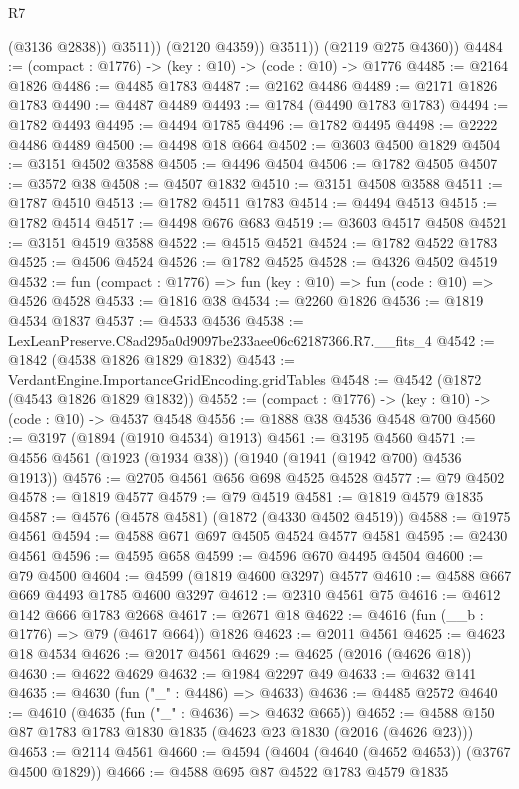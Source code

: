\begin{lexlean}{R7}
\begin{coremodule}
                  (@3136 @2838))
                @3511))
            (@2120 @4359))
          @3511))
      (@2119 @275 @4360))
@4484 := (compact : @1776) -> (key : @10) -> (code : @10) -> @1776
@4485 := @2164 @1826
@4486 := @4485 @1783
@4487 := @2162 @4486
@4489 := @2171 @1826 @1783
@4490 := @4487 @4489
@4493 := @1784 (@4490 @1783 @1783)
@4494 := @1782 @4493
@4495 := @4494 @1785
@4496 := @1782 @4495
@4498 := @2222 @4486 @4489
@4500 := @4498 @18 @664
@4502 := @3603 @4500 @1829
@4504 := @3151 @4502 @3588
@4505 := @4496 @4504
@4506 := @1782 @4505
@4507 := @3572 @38
@4508 := @4507 @1832
@4510 := @3151 @4508 @3588
@4511 := @1787 @4510
@4513 := @1782 @4511 @1783
@4514 := @4494 @4513
@4515 := @1782 @4514
@4517 := @4498 @676 @683
@4519 := @3603 @4517 @4508
@4521 := @3151 @4519 @3588
@4522 := @4515 @4521
@4524 := @1782 @4522 @1783
@4525 := @4506 @4524
@4526 := @1782 @4525
@4528 := @4326 @4502 @4519
@4532 := fun (compact : @1776) => fun (key : @10) => fun (code : @10) => @4526 @4528
@4533 := @1816 @38
@4534 := @2260 @1826
@4536 := @1819 @4534 @1837
@4537 := @4533 @4536
@4538 := LexLeanPreserve.C8ad295a0d9097be233aee06c62187366.R7.__fits_4
@4542 := @1842 (@4538 @1826 @1829 @1832)
@4543 := VerdantEngine.ImportanceGridEncoding.gridTables
@4548 := @4542 (@1872 (@4543 @1826 @1829 @1832))
@4552 := (compact : @1776) -> (key : @10) -> (code : @10) -> @4537 @4548
@4556 := @1888 @38 @4536 @4548 @700
@4560 := @3197 (@1894 (@1910 @4534) @1913)
@4561 := @3195 @4560
@4571 := @4556 @4561 (@1923 (@1934 @38)) (@1940 (@1941 (@1942 @700) @4536 @1913))
@4576 := @2705 @4561 @656 @698 @4525 @4528
@4577 := @79 @4502
@4578 := @1819 @4577
@4579 := @79 @4519
@4581 := @1819 @4579 @1835
@4587 := @4576 (@4578 @4581) (@1872 (@4330 @4502 @4519))
@4588 := @1975 @4561
@4594 := @4588 @671 @697 @4505 @4524 @4577 @4581
@4595 := @2430 @4561
@4596 := @4595 @658
@4599 := @4596 @670 @4495 @4504
@4600 := @79 @4500
@4604 := @4599 (@1819 @4600 @3297) @4577
@4610 := @4588 @667 @669 @4493 @1785 @4600 @3297
@4612 := @2310 @4561 @75
@4616 := @4612 @142 @666 @1783 @2668
@4617 := @2671 @18
@4622 := @4616 (fun (__b : @1776) => @79 (@4617 @664)) @1826
@4623 := @2011 @4561
@4625 := @4623 @18 @4534
@4626 := @2017 @4561
@4629 := @4625 (@2016 (@4626 @18))
@4630 := @4622 @4629
@4632 := @1984 @2297 @49
@4633 := @4632 @141
@4635 := @4630 (fun ("_" : @4486) => @4633)
@4636 := @4485 @2572
@4640 := @4610 (@4635 (fun ("_" : @4636) => @4632 @665))
@4652 := @4588 @150 @87 @1783 @1783 @1830 @1835 (@4623 @23 @1830 (@2016 (@4626 @23)))
@4653 := @2114 @4561
@4660 := @4594 (@4604 (@4640 (@4652 @4653)) (@3767 @4500 @1829))
@4666 := @4588 @695 @87 @4522 @1783 @4579 @1835

\end{coremodule}
\end{lexlean}
